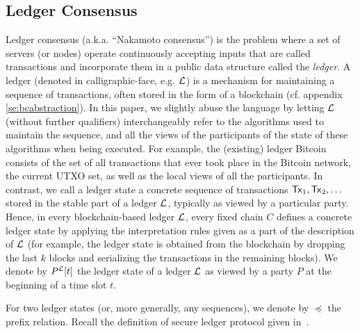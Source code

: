 \subsection{Ledger Consensus}
Ledger consensus (a.k.a. ``Nakamoto consensus'') is the problem where a set of servers
(or nodes) operate continuously accepting inputs
that are called transactions and incorporate them in a public data 
structure called the {\em ledger}. 
A ledger (denoted in calligraphic-face, e.g. $\mathcal{L}$) is a mechanism for maintaining a sequence of transactions, often
stored in the form of a blockchain (cf. appendix \ref{se:bcabstraction}). In this paper, we slightly abuse the language by letting $\mathcal{L}$ (without further
qualifiers) interchangeably refer to the algorithms used to maintain the sequence, and all the views of the
participants of the state of these algorithms when being executed. For example, the (existing) ledger Bitcoin
consists of the set of all transactions that ever took place in the Bitcoin network, the current UTXO set, as
well as the local views of all the participants.
In contrast, we call a ledger state a concrete sequence of transactions $\mathsf{Tx}_1,\mathsf{Tx}_2,\dots$ stored in the stable
part of a ledger $\mathcal{L}$, typically as viewed by a particular party. Hence, in every blockchain-based ledger $\mathcal{L}$,
every fixed chain $C$ defines a concrete ledger state by applying the interpretation rules given as a part of the
description of $\mathcal{L}$ %
(for example, the ledger state is obtained from the blockchain by dropping the last $k$ blocks
and serializing the transactions in the remaining blocks). We denote by $P^{\mathcal{L}}[t]$
the ledger state of a ledger $\mathcal{L}$ as viewed by a party $P$ at the beginning of a time slot $t$.


For two ledger states (or, more generally, any sequences), we denote by $\preceq$ the prefix relation.
Recall the definition of secure ledger protocol given in~\cite{sok}.


